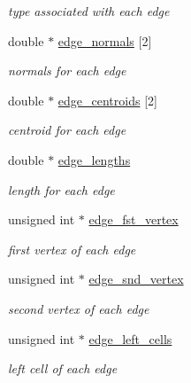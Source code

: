 \begin{DoxyCompactItemize}
\begin{DoxyCompactList}\small\item\em type associated with each edge \item\end{DoxyCompactList}\item 
double $\ast$ \hyperlink{structFVL_1_1CFVMesh2D__cuda_ae49cff6bcafed1edb776bf5104de51d1}{edge\_\-normals} \mbox{[}2\mbox{]}
\begin{DoxyCompactList}\small\item\em normals for each edge \item\end{DoxyCompactList}\item 
double $\ast$ \hyperlink{structFVL_1_1CFVMesh2D__cuda_aff4d73402091e4860e902f3f7f66a06c}{edge\_\-centroids} \mbox{[}2\mbox{]}
\begin{DoxyCompactList}\small\item\em centroid for each edge \item\end{DoxyCompactList}\item 
double $\ast$ \hyperlink{structFVL_1_1CFVMesh2D__cuda_ad9e8d94c7c782f032f8320f7d5ee618b}{edge\_\-lengths}
\begin{DoxyCompactList}\small\item\em length for each edge \item\end{DoxyCompactList}\item 
unsigned int $\ast$ \hyperlink{structFVL_1_1CFVMesh2D__cuda_a541be23cac3c920c96257391179a196c}{edge\_\-fst\_\-vertex}
\begin{DoxyCompactList}\small\item\em first vertex of each edge \item\end{DoxyCompactList}\item 
unsigned int $\ast$ \hyperlink{structFVL_1_1CFVMesh2D__cuda_a656712266e15816d723aae1c64411c52}{edge\_\-snd\_\-vertex}
\begin{DoxyCompactList}\small\item\em second vertex of each edge \item\end{DoxyCompactList}\item 
unsigned int $\ast$ \hyperlink{structFVL_1_1CFVMesh2D__cuda_aa06063ffa67470f21a645851175bf1f6}{edge\_\-left\_\-cells}
\begin{DoxyCompactList}\small\item\em left cell of each edge \item\end{DoxyCompactList}\item 

\end{DoxyCompactItemize}
